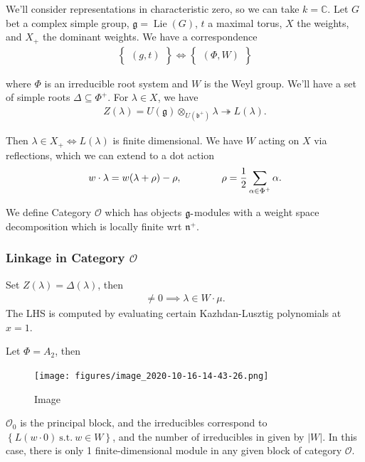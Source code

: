 We'll consider representations in characteristic zero, so we can take
\(k={\mathbb{C}}\). Let \(G\) bet a complex simple group,
\({\mathfrak{g}}= \operatorname{Lie}(G)\), \(t\) a maximal torus, \(X\)
the weights, and \(X_+\) the dominant weights. We have a correspondence
\Large
\begin{align*}   \left\{{\substack{(g, t)}}\right\} \iff \left\{{\substack{(\Phi, W)}}\right\} \end{align*}
\normalsize

where \(\Phi\) is an irreducible root system and \(W\) is the Weyl
group. We'll have a set of simple roots \(\Delta\subseteq \Phi^+\). For
\(\lambda\in X\), we have
\begin{align*}   Z(\lambda) = U({\mathfrak{g}}) \otimes_{U({\mathfrak{b}}^+)} \lambda \twoheadrightarrow L(\lambda) .\end{align*}

Then \(\lambda \in X_+ \iff L(\lambda)\) is finite dimensional. We have
\(W\) acting on \(X\) via reflections, which we can extend to a dot
action
\begin{align*}   w\cdot \lambda = w(\lambda + \rho) - \rho, \hspace{4em} \rho = {1\over 2}\sum_{\alpha\in\Phi^+} \alpha .\end{align*}

We define Category \({\mathcal{O}}\) which has objects
\({\mathfrak{g}}{\hbox{-}}\)modules with a weight space decomposition
which is locally finite wrt \({\mathfrak{n}}^+\).

\hypertarget{linkage-in-category-mathcalo}{%
\subsubsection{\texorpdfstring{Linkage in Category
\({\mathcal{O}}\)}{Linkage in Category \{\textbackslash mathcal\{O\}\}}}\label{linkage-in-category-mathcalo}}

Set \(Z(\lambda) = \Delta(\lambda)\), then
\begin{align*}   [Z(\lambda) : L(\mu)] \neq 0 \implies \lambda \in W\cdot \mu .\end{align*}
The LHS is computed by evaluating certain Kazhdan-Lusztig polynomials at
\(x=1\).

\begin{example}

\begin{example}

Let \(\Phi= A_2\), then

\begin{figure}
\centering
\texttt{[image: figures/image\_2020-10-16-14-43-26.png]}
\caption{Image}
\end{figure}

\({\mathcal{O}}_0\) is the principal block, and the irreducibles
correspond to \(\left\{{L(w\cdot 0) ~{\text{s.t.}}~w\in W}\right\}\),
and the number of irreducibles in given by
\({\left\lvert {W} \right\rvert}\). In this case, there is only 1
finite-dimensional module in any given block of category
\({\mathcal{O}}\).

\end{example}

\end{example}

